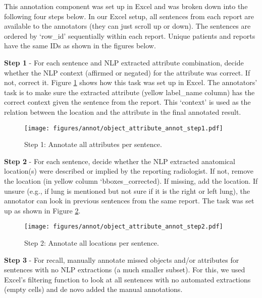 This annotation component was set up in Excel and was broken down into the following four steps below. In our Excel setup, all sentences from each report are available to the annotators (they can just scroll up or down). The sentences are ordered by `row\_id' sequentially within each report. Unique patients and reports have the same IDs as shown in the figures below.

\textbf{Step 1} - For each sentence and NLP extracted attribute combination, decide whether the NLP context (affirmed or negated) for the attribute was correct. If not, correct it. Figure \ref{fig:object-attribute-step1} shows how this task was set up in Excel. The annotators' task is to make sure the extracted attribute (yellow label\_name column) has the correct context given the sentence from the report. This `context' is used as the relation between the location and the attribute in the final annotated result.

\begin{figure}[!ht]
\centering
\texttt{[image: figures/annot/object\_attribute\_annot\_step1.pdf]}
\caption{Step 1: Annotate all attributes per sentence.}
\label{fig:object-attribute-step1}
\end{figure}

\textbf{Step 2} - For each sentence, decide whether the NLP extracted anatomical location(s) were described or implied by the reporting radiologist. If not, remove the location (in yellow column `bboxes\_corrected). If missing, add the location. If unsure (e.g., if lung is mentioned but not sure if it is the right or left lung), the annotator can look in previous sentences from the same report. The task was set up as shown in Figure \ref{fig:object-attribute-step2}.

\begin{figure}[!ht]
\centering
\texttt{[image: figures/annot/object\_attribute\_annot\_step2.pdf]}
\caption{Step 2: Annotate all locations per sentence.}
\label{fig:object-attribute-step2}
\end{figure}

\textbf{Step 3} - For recall, manually annotate missed objects and/or attributes for sentences with no NLP extractions (a much smaller subset). For this, we used Excel's filtering function to look at all sentences with no automated extractions (empty cells) and de novo added the manual annotations.

